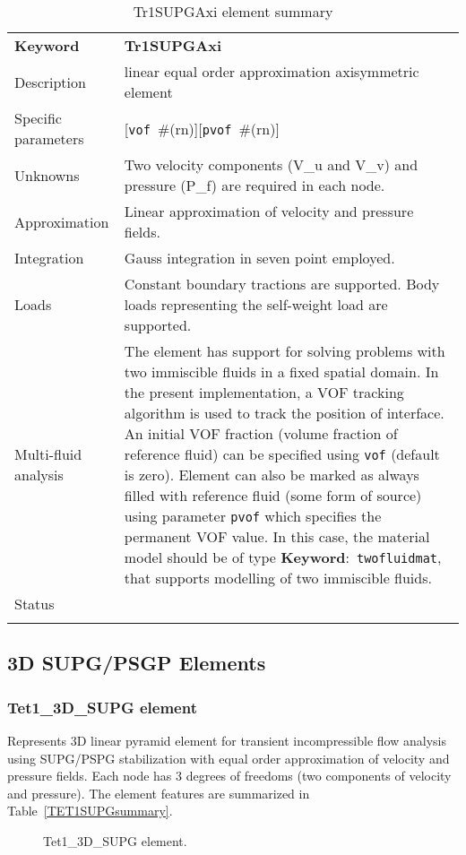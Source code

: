 \documentclass[a4paper]{article}
\newcommand{\descitem}[1]{{\noindent \textbf{#1}}:}
\newcommand{\elemkeyword}[1]{\descitem{Keyword}~\param{#1}} %
\newcommand{\param}[1]{\texttt{#1}} %
\newcommand{\optional}[1]{[#1]} %
\newcommand{\field}[2]{\param{#1}~\#{\tiny(#2)}} %
\newcommand{\optField}[2]{\optional{\field{#1}{#2}}}
\newcommand{\templabel}{}%
\newcommand{\tempcaption}{}%
\newcounter{nelpar}
\newenvironment{elementsummary}[5]{%
  \gdef\tempcaption{#4}%
  \gdef\templabel{#5}%
  \setcounter{nelpar}{0}%
  \begin{center} %
    \begin{table}[!htb] %
      \begin{tabular}{|l|p{9cm}|}\hline %
        {\bf Keyword} & \bf{#1}\\ %
        {Description} & {#2}\\ %
        {Specific parameters} & {#3}\\ \hline %
}{
  \\ \hline %
      \end{tabular}%
      \caption{\tempcaption}%
      \label{\templabel}%
    \end{table}%
  \end{center}%
}
\newcommand{\elementDescription}[2]{{#1} & {#2}\\ }
\begin{document}
\begin{elementsummary}{Tr1SUPGAxi}{linear equal order approximation axisymmetric element}
  {\optField{vof}{rn}\optField{pvof}{rn}}{Tr1SUPGAxi element summary}{Tr1SUPGAxisummary}
\elementDescription{Unknowns}{Two velocity components (V\_u and V\_v) and pressure (P\_f) are required in each node.}
\elementDescription{Approximation}{Linear approximation of velocity and pressure fields.}
\elementDescription{Integration}{Gauss integration in seven point employed.}
\elementDescription{Loads}{Constant boundary tractions are supported. Body loads
representing the self-weight load are supported.}
\elementDescription{Multi-fluid analysis}{The element has support for solving
problems with two immiscible fluids in
a fixed spatial domain. In the present implementation, a VOF tracking algorithm
is used to track the position of interface. An initial VOF fraction
(volume fraction of reference fluid) can be specified using
\param{vof} (default is zero). Element can also be marked as always
filled with reference fluid (some form of source) using parameter
\param{pvof} which specifies the permanent VOF value. In this case,
the material model should be of type \elemkeyword{twofluidmat}, that
supports modelling of two immiscible fluids.}
\elementDescription{Status}{}
\end{elementsummary}


\clearpage
\subsection{3D SUPG/PSGP Elements}
\subsubsection{Tet1\_3D\_SUPG element}
\label{PY1_3D_SUPG}
Represents 3D linear pyramid element for transient
incompressible flow analysis using SUPG/PSPG stabilization with equal order
approximation of velocity and pressure fields. Each node has 3 degrees
of freedoms (two components of velocity and pressure). The element features are summarized in Table~\ref{TET1SUPGsummary}.

\begin{figure}[htb]
 \centering
 \begin{makeimage}
  
 \end{makeimage}
 \caption{Tet1\_3D\_SUPG element.}
 \label{PY1_3D_SUPGfig}
\end{figure}
\end{document}
